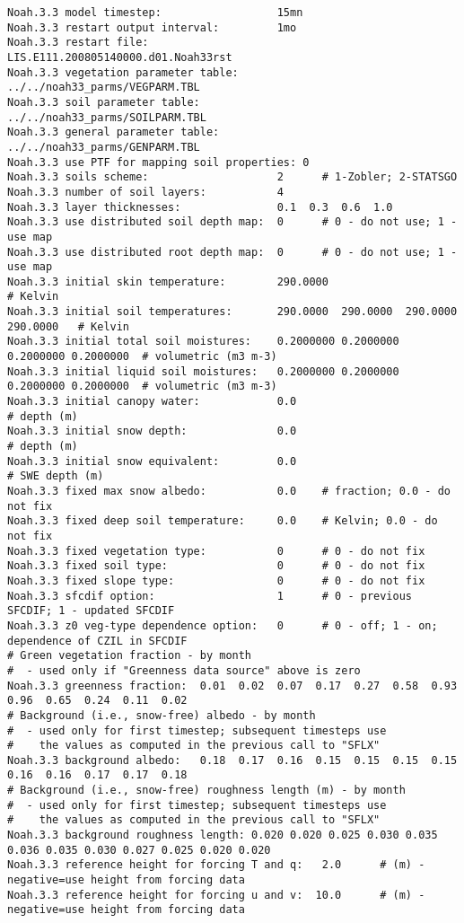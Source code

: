  \begin{Verbatim}[frame=single]
Noah.3.3 model timestep:                  15mn
Noah.3.3 restart output interval:         1mo
Noah.3.3 restart file:                    LIS.E111.200805140000.d01.Noah33rst
Noah.3.3 vegetation parameter table:      ../../noah33_parms/VEGPARM.TBL
Noah.3.3 soil parameter table:            ../../noah33_parms/SOILPARM.TBL
Noah.3.3 general parameter table:         ../../noah33_parms/GENPARM.TBL
Noah.3.3 use PTF for mapping soil properties: 0
Noah.3.3 soils scheme:                    2      # 1-Zobler; 2-STATSGO
Noah.3.3 number of soil layers:           4
Noah.3.3 layer thicknesses:               0.1  0.3  0.6  1.0
Noah.3.3 use distributed soil depth map:  0      # 0 - do not use; 1 - use map
Noah.3.3 use distributed root depth map:  0      # 0 - do not use; 1 - use map
Noah.3.3 initial skin temperature:        290.0000                                 # Kelvin
Noah.3.3 initial soil temperatures:       290.0000  290.0000  290.0000  290.0000   # Kelvin
Noah.3.3 initial total soil moistures:    0.2000000 0.2000000 0.2000000 0.2000000  # volumetric (m3 m-3)
Noah.3.3 initial liquid soil moistures:   0.2000000 0.2000000 0.2000000 0.2000000  # volumetric (m3 m-3)
Noah.3.3 initial canopy water:            0.0                                      # depth (m)
Noah.3.3 initial snow depth:              0.0                                      # depth (m)
Noah.3.3 initial snow equivalent:         0.0                                      # SWE depth (m)
Noah.3.3 fixed max snow albedo:           0.0    # fraction; 0.0 - do not fix
Noah.3.3 fixed deep soil temperature:     0.0    # Kelvin; 0.0 - do not fix
Noah.3.3 fixed vegetation type:           0      # 0 - do not fix
Noah.3.3 fixed soil type:                 0      # 0 - do not fix
Noah.3.3 fixed slope type:                0      # 0 - do not fix
Noah.3.3 sfcdif option:                   1      # 0 - previous SFCDIF; 1 - updated SFCDIF
Noah.3.3 z0 veg-type dependence option:   0      # 0 - off; 1 - on; dependence of CZIL in SFCDIF
# Green vegetation fraction - by month
#  - used only if "Greenness data source" above is zero
Noah.3.3 greenness fraction:  0.01  0.02  0.07  0.17  0.27  0.58  0.93  0.96  0.65  0.24  0.11  0.02
# Background (i.e., snow-free) albedo - by month
#  - used only for first timestep; subsequent timesteps use
#    the values as computed in the previous call to "SFLX"
Noah.3.3 background albedo:   0.18  0.17  0.16  0.15  0.15  0.15  0.15  0.16  0.16  0.17  0.17  0.18
# Background (i.e., snow-free) roughness length (m) - by month
#  - used only for first timestep; subsequent timesteps use
#    the values as computed in the previous call to "SFLX"
Noah.3.3 background roughness length: 0.020 0.020 0.025 0.030 0.035 0.036 0.035 0.030 0.027 0.025 0.020 0.020
Noah.3.3 reference height for forcing T and q:   2.0      # (m) - negative=use height from forcing data
Noah.3.3 reference height for forcing u and v:  10.0      # (m) - negative=use height from forcing data
 \end{Verbatim}


